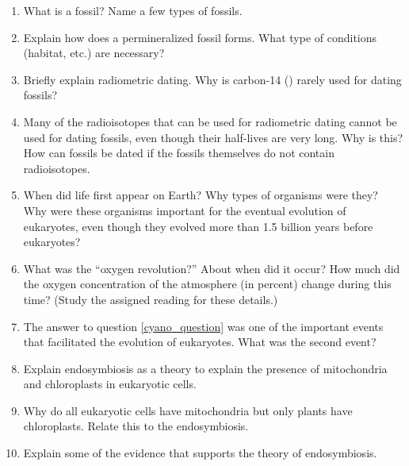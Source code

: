 \documentclass[letterpaper]{tufte-handout}
\begin{document}
\begin{enumerate}

	\item What is a fossil? Name a few types of fossils. 

	\item Explain how does a permineralized fossil forms. What type of conditions (habitat, etc.) are necessary?

	\item Briefly explain radiometric dating. Why is carbon-14 ({}) rarely used for dating fossils? 
	
	\item Many of the radioisotopes that can be used for radiometric dating cannot be used for dating fossils, even though their half-lives are very long. Why is this? How can fossils be dated if the fossils themselves do not contain radioisotopes.
	
	\item When did life first appear on Earth? Why types of organisms were they? Why were these organisms important for the eventual evolution of eukaryotes, even though they evolved more than 1.5 billion years before eukaryotes?\label{cyano_question}
	
	\item What was the ``oxygen revolution?'' About when did it occur?  How much did the oxygen concentration of the atmosphere (in percent) change during this time? (Study the assigned reading for these details.)
	
	\item The answer to question \ref{cyano_question} was one of the important events that facilitated the evolution of eukaryotes. What was the second event?
	
	\item Explain endosymbiosis  as a theory to explain the presence of mitochondria and chloroplasts in eukaryotic cells.
	
	\item Why do all eukaryotic cells have mitochondria but only plants have chloroplasts. Relate this to the endosymbiosis.
	
	\item Explain some of the evidence that supports the theory of endosymbiosis.
	
	
\end{enumerate}
\end{document}
